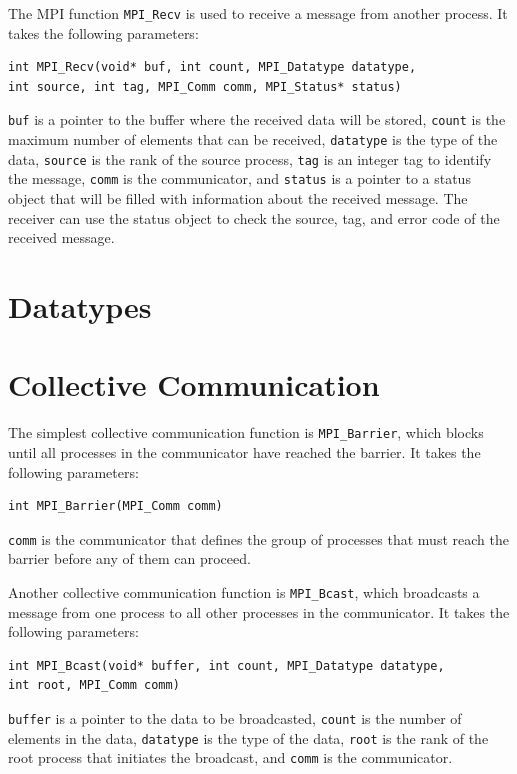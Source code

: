 \documentclass[letterpaper]{report}
\begin{document}
The MPI function \texttt{MPI\_Recv} is used to receive a message from another process.
It takes the following parameters:

\begin{verbatim}
int MPI_Recv(void* buf, int count, MPI_Datatype datatype,
int source, int tag, MPI_Comm comm, MPI_Status* status)
\end{verbatim}

\texttt{buf} is a pointer to the buffer where the received data will be stored,
\texttt{count} is the maximum number of elements that can be received,
\texttt{datatype} is the type of the data, \texttt{source} is the rank
of the source process, \texttt{tag} is an integer tag to identify the message,
\texttt{comm} is the communicator, and \texttt{status} is a pointer to a status
object that will be filled with information about the received message.
The receiver can use the status object to check the source, tag,
and error code of the received message.

\chapter{Datatypes}

\chapter{Collective Communication}

The simplest collective communication function is \texttt{MPI\_Barrier}, which blocks
until all processes in the communicator have reached the barrier.
It takes the following parameters:

\begin{verbatim}
int MPI_Barrier(MPI_Comm comm)
\end{verbatim}

\texttt{comm} is the communicator that defines the group of processes that must
reach the barrier before any of them can proceed.

Another collective communication function is \texttt{MPI\_Bcast},
which broadcasts a message from one process to all other processes in the communicator.
It takes the following parameters:

\begin{verbatim}
int MPI_Bcast(void* buffer, int count, MPI_Datatype datatype,
int root, MPI_Comm comm)
\end{verbatim}

\texttt{buffer} is a pointer to the data to be broadcasted, \texttt{count} is the number
of elements in the data, \texttt{datatype} is the type of the data, \texttt{root} is the rank
of the root process that initiates the broadcast, and \texttt{comm} is the communicator.
\end{document}
